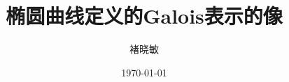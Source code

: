 \documentclass[a4paper, UTF8, CJKmath=true, fontset=macnew, zihao=5]{ctexrep}
\title{椭圆曲线定义的Galois表示的像}
\author{褚晓敏}
\date{\today}
\begin{document}
    \maketitle

    \begin{abstract}
        
    \end{abstract}

    \renewcommand{\abstractname}{Abstract}

    \begin{abstract}
        
    \end{abstract}

    \tableofcontents

    \clearpage

    

    \printbibliography[heading=bibliography,title=参考文献]
\end{document}
